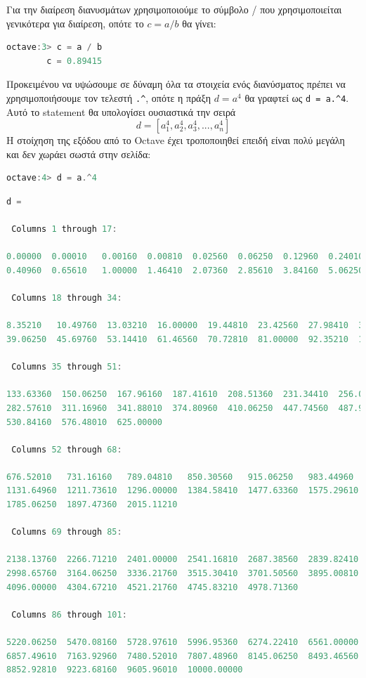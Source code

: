 \documentclass{article}
\begin{document}
Για την διαίρεση διανυσμάτων χρησιμοποιούμε το σύμβολο / που χρησιμοποιείται
γενικότερα για διαίρεση, οπότε το $c = a / b$ θα γίνει:

\begin{lstlisting}[language=octave]
        octave:3> c = a / b
        c = 0.89415
\end{lstlisting}

Προκειμένου να υψώσουμε σε δύναμη όλα τα στοιχεία ενός διανύσματος πρέπει να
χρησιμοποιήσουμε τον τελεστή \lstinline{.^}, οπότε η πράξη $d = a^4$ θα γραφτεί
ως \lstinline{d = a.^4}. Αυτό το statement θα υπολογίσει ουσιαστικά την σειρά
\[d = [a_1^4, a_2^4, a_3^4, ..., a_n^4]\]
Η στοίχηση της εξόδου από το Octave έχει τροποποιηθεί
επειδή είναι πολύ μεγάλη και δεν χωράει σωστά στην σελίδα:

\begin{lstlisting}[language=octave]
        octave:4> d = a.^4
\end{lstlisting}
\begin{lstlisting}[language=octave,basicstyle=\tiny]
        d =

 Columns 1 through 17:

0.00000  0.00010   0.00160  0.00810  0.02560  0.06250  0.12960  0.24010 
0.40960  0.65610   1.00000  1.46410  2.07360  2.85610  3.84160  5.06250  6.55360

 Columns 18 through 34:

8.35210   10.49760  13.03210  16.00000  19.44810  23.42560  27.98410  33.17760
39.06250  45.69760  53.14410  61.46560  70.72810  81.00000  92.35210  104.85760  118.59210

 Columns 35 through 51:

133.63360  150.06250  167.96160  187.41610  208.51360  231.34410  256.00000
282.57610  311.16960  341.88010  374.80960  410.06250  447.74560  487.96810
530.84160  576.48010  625.00000

 Columns 52 through 68:

676.52010   731.16160   789.04810   850.30560   915.06250   983.44960   1055.60010
1131.64960  1211.73610  1296.00000  1384.58410  1477.63360  1575.29610  1677.72160
1785.06250  1897.47360  2015.11210

 Columns 69 through 85:

2138.13760  2266.71210  2401.00000  2541.16810  2687.38560  2839.82410
2998.65760  3164.06250  3336.21760  3515.30410  3701.50560  3895.00810
4096.00000  4304.67210  4521.21760  4745.83210  4978.71360

 Columns 86 through 101:

5220.06250  5470.08160  5728.97610  5996.95360  6274.22410  6561.00000
6857.49610  7163.92960  7480.52010  7807.48960  8145.06250  8493.46560
8852.92810  9223.68160  9605.96010  10000.00000
\end{lstlisting}
\end{document}

